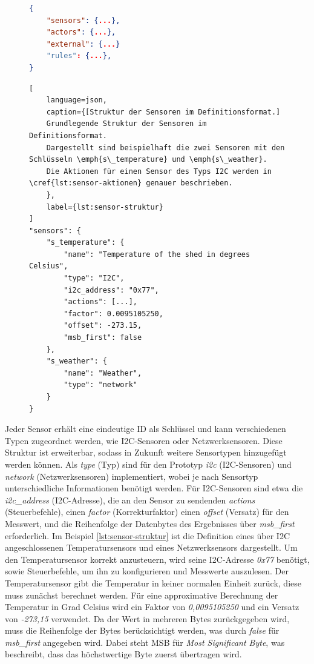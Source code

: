 \begin{figure}[!htb]
\begin{lstlisting}[language=json, caption={[JSON Struktur des Definitionsformates]
	Grundlegende JSON Struktur des Definitionsformates.
	Die Sensoren sind in \cref{lst:sensor-struktur} genauer beschrieben.
	Die Aktuatoren sind nicht implementiert.
	Die externen Datenquellen sind in \cref{lst:external-struktur} genauer beschrieben.
	Die Regeln sind in \cref{lst:rule-struktur} genauer beschrieben.
},
	label={lst:grundlegende-struktur}
]
{
	"sensors": {...},
	"actors": {...},
	"external": {...}
	"rules": {...},
}
\end{lstlisting}
\end{figure}
\begin{figure}[!htb]
\begin{lstlisting}[
	language=json,
	caption={[Struktur der Sensoren im Definitionsformat.]
	Grundlegende Struktur der Sensoren im Definitionsformat.
	Dargestellt sind beispielhaft die zwei Sensoren mit den Schlüsseln \emph{s\_temperature} und \emph{s\_weather}.
	Die Aktionen für einen Sensor des Typs I2C werden in \cref{lst:sensor-aktionen} genauer beschrieben.
	},
	label={lst:sensor-struktur}
]
"sensors": {
	"s_temperature": {
		"name": "Temperature of the shed in degrees Celsius",
		"type": "I2C",
		"i2c_address": "0x77",
		"actions": [...],
		"factor": 0.0095105250,
		"offset": -273.15,
		"msb_first": false
	},
	"s_weather": {
		"name": "Weather",
		"type": "network"
	}
}
\end{lstlisting}
\end{figure}

Jeder Sensor erhält eine eindeutige ID als Schlüssel und kann verschiedenen Typen zugeordnet werden, wie I2C-Sensoren oder Netzwerksensoren.
Diese Struktur ist erweiterbar, sodass in Zukunft weitere Sensortypen hinzugefügt werden können.
Als \emph{type} (Typ) sind für den Prototyp \emph{i2c} (I2C-Sensoren) und \emph{network} (Netzwerksensoren) implementiert, wobei je nach Sensortyp unterschiedliche Informationen benötigt werden.
Für I2C-Sensoren sind etwa die \emph{i2c\_address} (I2C-Adresse), die an den Sensor zu sendenden \emph{actions} (Steuerbefehle), einen \emph{factor} (Korrekturfaktor) einen \emph{offset} (Versatz) für den Messwert, und die Reihenfolge der Datenbytes des Ergebnisses über \emph{msb\_first} erforderlich.
Im Beispiel \cref{lst:sensor-struktur} ist die Definition eines über I2C angeschlossenen Temperatursensors und eines Netzwerksensors dargestellt.
Um den Temperatursensor korrekt anzusteuern, wird seine I2C-Adresse \emph{0x77} benötigt, sowie Steuerbefehle, um ihn zu konfigurieren und Messwerte auszulesen.
Der Temperatursensor gibt die Temperatur in keiner normalen Einheit zurück, diese muss zunächst berechnet werden.
Für eine approximative Berechnung der Temperatur in Grad Celsius wird ein Faktor von \emph{0,0095105250} und ein Versatz von \emph{-273,15} verwendet.
Da der Wert in mehreren Bytes zurückgegeben wird, muss die Reihenfolge der Bytes berücksichtigt werden, was durch \emph{false} für \emph{msb\_first} angegeben wird.
Dabei steht MSB für \emph{Most Significant Byte}, was beschreibt, dass das höchstwertige Byte zuerst übertragen wird.

